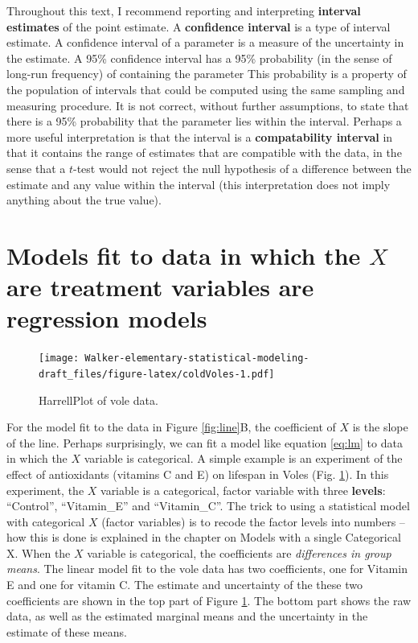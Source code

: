 \documentclass[]{book}
\begin{document}
Throughout this text, I recommend reporting and interpreting \textbf{interval estimates} of the point estimate. A \textbf{confidence interval} is a type of interval estimate. A confidence interval of a parameter is a measure of the uncertainty in the estimate. A 95\% confidence interval has a 95\% probability (in the sense of long-run frequency) of containing the parameter This probability is a property of the population of intervals that could be computed using the same sampling and measuring procedure. It is not correct, without further assumptions, to state that there is a 95\% probability that the parameter lies within the interval. Perhaps a more useful interpretation is that the interval is a \textbf{compatability interval} in that it contains the range of estimates that are compatible with the data, in the sense that a \(t\)-test would not reject the null hypothesis of a difference between the estimate and any value within the interval (this interpretation does not imply anything about the true value).

\hypertarget{models-fit-to-data-in-which-the-x-are-treatment-variables-are-regression-models}{%
\section{\texorpdfstring{Models fit to data in which the \(X\) are treatment variables are regression models}{Models fit to data in which the X are treatment variables are regression models}}\label{models-fit-to-data-in-which-the-x-are-treatment-variables-are-regression-models}}

\begin{figure}
\centering
\texttt{[image: Walker-elementary-statistical-modeling-draft\_files/figure-latex/coldVoles-1.pdf]}
\caption{\label{fig:coldVoles}HarrellPlot of vole data.}
\end{figure}

For the model fit to the data in Figure \ref{fig:line}B, the coefficient of \(X\) is the slope of the line. Perhaps surprisingly, we can fit a model like equation \eqref{eq:lm} to data in which the \(X\) variable is categorical. A simple example is an experiment of the effect of antioxidants (vitamins C and E) on lifespan in Voles (Fig. \ref{fig:coldVoles}). In this experiment, the \(X\) variable is a categorical, factor variable with three \textbf{levels}: ``Control'', ``Vitamin\_E'' and ``Vitamin\_C''. The trick to using a statistical model with categorical \(X\) (factor variables) is to recode the factor levels into numbers -- how this is done is explained in the chapter on Models with a single Categorical X. When the \(X\) variable is categorical, the coefficients are \emph{differences in group means}. The linear model fit to the vole data has two coefficients, one for Vitamin E and one for vitamin C. The estimate and uncertainty of the these two coefficients are shown in the top part of Figure \ref{fig:coldVoles}. The bottom part shows the raw data, as well as the estimated marginal means and the uncertainty in the estimate of these means.
\end{document}
